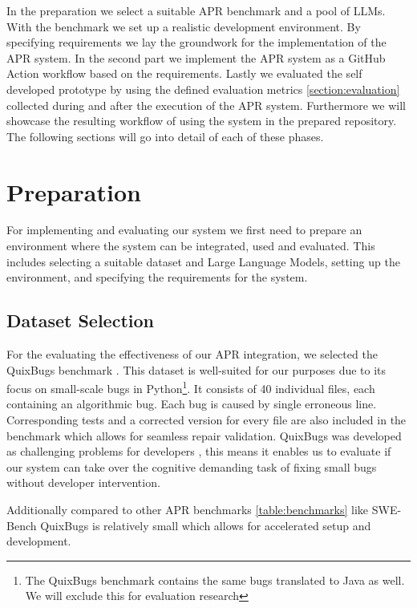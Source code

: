 In the preparation we select a suitable APR benchmark and a pool of LLMs. With the benchmark we set up a realistic development environment. By specifying requirements we lay the groundwork for the implementation of the APR system.
In the second part we implement the APR system as a GitHub Action workflow based on the requirements.
Lastly we evaluated the self developed prototype by using the defined evaluation metrics \ref{section:evaluation} collected during and after the execution of the APR system. Furthermore we will showcase the resulting workflow of using the system in the prepared repository.
The following sections will go into detail of each of these phases.

\section{Preparation}

For implementing and evaluating our system we first need to prepare an environment where the system can be integrated, used and evaluated. This includes selecting a suitable dataset and Large Language Models, setting up the environment, and specifying the requirements for the system.

\subsection{Dataset Selection}

For the evaluating the effectiveness of our APR integration, we selected the QuixBugs benchmark \cite{linQuixBugsMultilingualProgram2017}. This dataset is well-suited for our purposes due to its focus on small-scale bugs in Python\footnote{The QuixBugs benchmark contains the same bugs translated to Java as well. We will exclude this for evaluation research}. It consists of 40 individual files, each containing an algorithmic bug. Each bug is caused by single erroneous line. Corresponding tests and a corrected version for every file are also included in the benchmark which allows for seamless repair validation. QuixBugs was developed as challenging problems for developers \cite{linQuixBugsMultilingualProgram2017}, this means it enables us to evaluate if our system can take over the cognitive demanding task of fixing small bugs without developer intervention.

Additionally compared to other APR benchmarks \ref{table:benchmarks} like SWE-Bench \cite{jimenezSWEbenchCanLanguage2024} QuixBugs is relatively small which allows for accelerated setup and development.

